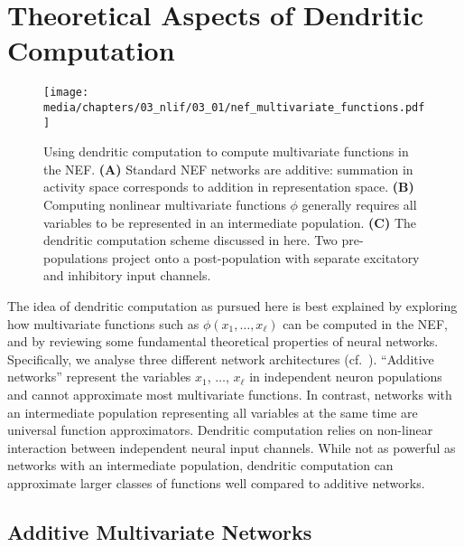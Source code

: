 \section{Theoretical Aspects of Dendritic Computation}
\label{sec:dendritic_computation_theory}

\begin{figure}
	\centering
	\texttt{[image: media/chapters/03\_nlif/03\_01/nef\_multivariate\_functions.pdf]}%
	{\label{fig:nef_multivariate_functions_a}}%
	{\label{fig:nef_multivariate_functions_b}}%
	{\label{fig:nef_multivariate_functions_c}}%
	\caption[Using dendritic computation to compute multivariate functions in the NEF]{Using dendritic computation to compute multivariate functions in the NEF. \textbf{(A)} Standard NEF networks are additive: summation in activity space corresponds to addition in representation space.
	\textbf{(B)} Computing nonlinear multivariate functions $\phi$ generally requires all variables to be represented in an intermediate population.
	\textbf{(C)} The dendritic computation scheme discussed in here.
	Two pre-populations project onto a post-population with separate excitatory and inhibitory input channels.
	}
	\label{fig:nef_multivariate_functions}
\end{figure}

The idea of dendritic computation as pursued here is best explained by exploring how mul\-ti\-va\-ri\-ate functions such as $\phi(x_1, \ldots, x_\ell)$ can be computed in the NEF, and by reviewing some fundamental theoretical properties of neural networks.
Specifically, we analyse three different network architectures (cf.~).
\enquote{Additive networks} represent the variables $x_1$, $\ldots$, $x_\ell$ in independent neuron populations and cannot approximate most multivariate functions.
In contrast, networks with an intermediate population representing all variables at the same time are universal function approximators.
Dendritic computation relies on non-linear interaction between independent neural input channels.
While not as powerful as networks with an intermediate population, dendritic computation can approximate larger classes of functions well compared to additive networks.

\subsection{Additive Multivariate Networks}
\label{sec:additive_net}

